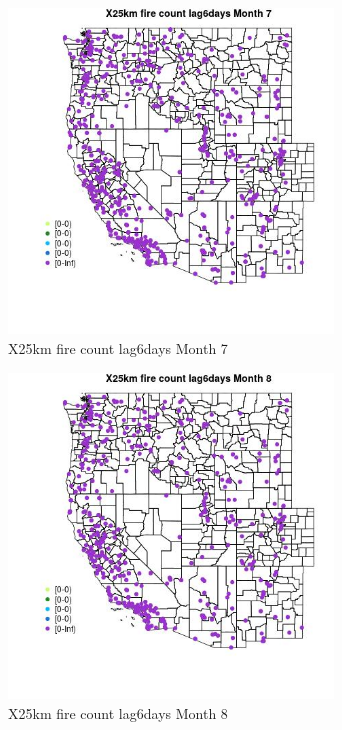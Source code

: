 \begin{figure} 
\centering  
\includegraphics[width=0.77\textwidth]{Code_Outputs/Report_ML_input_PM25_Step4_part_e_de_duplicated_aves_compiled_2019-05-14wNAs_MapObsMo7X25km_fire_count_lag6days.jpg} 
\caption{\label{fig:Report_ML_input_PM25_Step4_part_e_de_duplicated_aves_compiled_2019-05-14wNAsMapObsMo7X25km_fire_count_lag6days}X25km fire count lag6days Month 7} 
\end{figure} 
 

\clearpage 

\begin{figure} 
\centering  
\includegraphics[width=0.77\textwidth]{Code_Outputs/Report_ML_input_PM25_Step4_part_e_de_duplicated_aves_compiled_2019-05-14wNAs_MapObsMo8X25km_fire_count_lag6days.jpg} 
\caption{\label{fig:Report_ML_input_PM25_Step4_part_e_de_duplicated_aves_compiled_2019-05-14wNAsMapObsMo8X25km_fire_count_lag6days}X25km fire count lag6days Month 8} 
\end{figure} 
 

